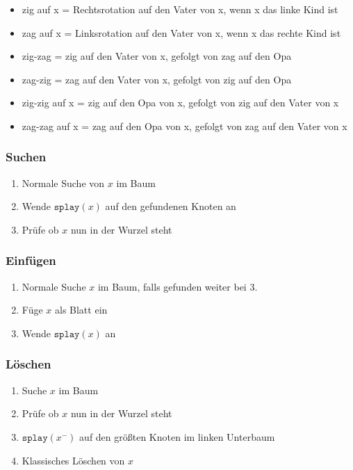 \documentclass[11pt]{scrartcl}
\begin{document}
\begin{itemize}
	\item zig auf x = Rechtsrotation auf den Vater von x, wenn x das linke Kind ist
    \item zag auf x = Linksrotation auf den Vater von x, wenn x das rechte Kind ist
    \item zig-zag = zig auf den Vater von x, gefolgt von zag auf den Opa
    \item zag-zig = zag auf den Vater von x, gefolgt von zig auf den Opa
    \item zig-zig auf x = zig auf den Opa von x, gefolgt von zig auf den Vater von x
    \item zag-zag auf x = zag auf den Opa von x, gefolgt von zag auf den Vater von x
\end{itemize}

\subsubsection{Suchen}
\begin{enumerate}
	\item Normale Suche von $x$ im Baum
    \item Wende $\texttt{splay}(x)$ auf den gefundenen Knoten an
    \item Prüfe ob $x$ nun in der Wurzel steht
\end{enumerate}

\subsubsection{Einfügen}
\begin{enumerate}
	\item Normale Suche $x$ im Baum, falls gefunden weiter bei 3.
    \item Füge $x$ als Blatt ein
    \item Wende $\texttt{splay}(x)$ an
\end{enumerate}

\subsubsection{Löschen}
\begin{enumerate}
	\item Suche $x$ im Baum
    \item Prüfe ob $x$ nun in der Wurzel steht
    \item $\texttt{splay}(x^-)$ auf den größten Knoten im linken Unterbaum
    \item Klassisches Löschen von $x$
\end{enumerate}
\end{document}
